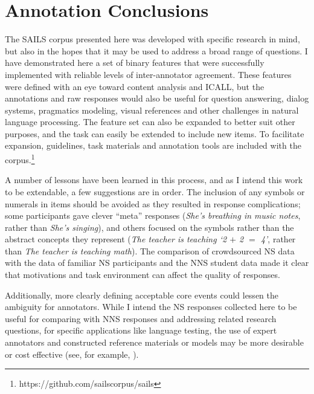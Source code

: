 \section{Annotation Conclusions}
\label{sec:annotation-conclusions}

The SAILS corpus presented here was developed with specific research in mind, but also in the hopes that it may be used to address a broad range of questions. I have demonstrated here a set of binary features that were successfully implemented with reliable levels of inter-annotator agreement. These features were defined with an eye toward content analysis and ICALL, but the annotations and raw responses would also be useful for question answering, dialog systems, pragmatics modeling, visual references and other challenges in natural language processing. The feature set can also be expanded to better suit other purposes, and the task can easily be extended to include new items. To facilitate expansion, guidelines, task materials and annotation tools are included with the corpus.\footnote{https://github.com/sailscorpus/sails}

A number of lessons have been learned in this process, and as I intend this work to be extendable, a few suggestions are in order. The inclusion of any symbols or numerals in items should be avoided as they resulted in response complications; some participants gave clever ``meta'' responses (\textit{She's breathing in music notes}, rather than \textit{She's singing}), and others focused on the symbols rather than the abstract concepts they represent (\textit{The teacher is teaching `2 $+$ 2 $=$ 4'}, rather than \textit{The teacher is teaching math}). The comparison of crowdsourced NS data with the data of familiar NS participants and the NNS student data made it clear that motivations and task environment can affect the quality of responses.

Additionally, more clearly defining acceptable core events could lessen the ambiguity for annotators. While I intend the NS responses collected here to be useful for comparing with NNS responses and addressing related research questions, for specific applications like language testing, the use of expert annotators and constructed reference materials or models may be more desirable or cost effective (see, for example, \citet{somasundaran:chodorow:14}).
